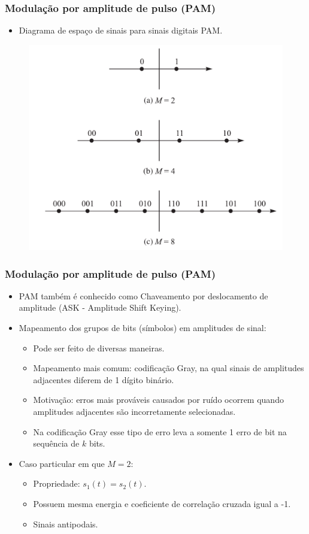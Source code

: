 \begin{frame}
	\frametitle{Modulação por amplitude de pulso (PAM)}

	\begin{itemize}
		\item Diagrama de espaço de sinais para sinais digitais PAM.
	\end{itemize}
	
	\begin{figure}[t]
	  \begin{center}
	    \includegraphics[width=0.6\columnwidth]{figs/4-3-1}
	  \end{center}
	\end{figure}

\end{frame}

\begin{frame}
	\frametitle{Modulação por amplitude de pulso (PAM)}

	\begin{itemize}
		\item PAM também é conhecido como Chaveamento por deslocamento de amplitude (ASK - Amplitude Shift Keying).
		\item Mapeamento dos grupos de bits (símbolos) em amplitudes de sinal:
		\begin{itemize}
			\item Pode ser feito de diversas maneiras.
			\item Mapeamento mais comum: codificação Gray, na qual sinais de amplitudes adjacentes diferem de 1 dígito binário.
			\item Motivação: erros mais prováveis causados por ruído ocorrem quando amplitudes adjacentes são incorretamente selecionadas.
			\item Na codificação Gray esse tipo de erro leva a somente 1 erro de bit na sequência de $k$ bits.
		\end{itemize}
		\item Caso particular em que $M=2$:
		\begin{itemize}
			\item Propriedade: $s_1(t) = s_2(t)$.
			\item Possuem mesma energia e coeficiente de correlação cruzada igual a -1.
			\item Sinais antipodais. 
		\end{itemize}

	\end{itemize}

\end{frame}

